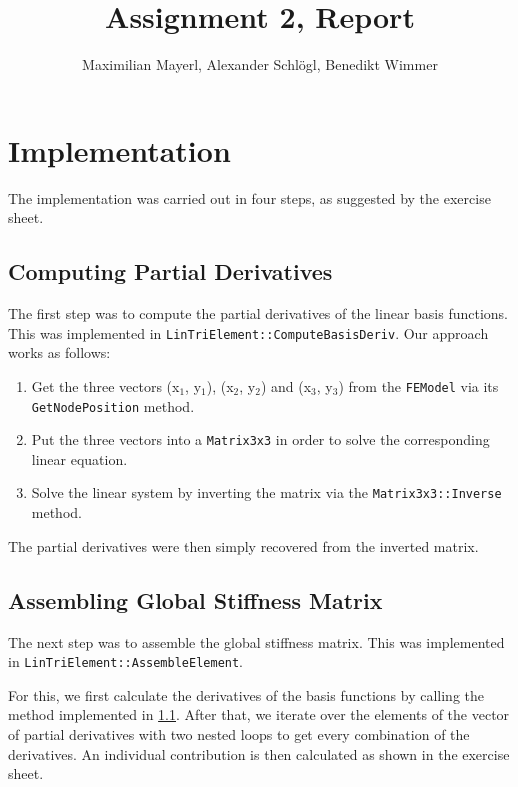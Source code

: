 \documentclass[11pt]{article}
\author{Maximilian Mayerl, Alexander Schl\"ogl, Benedikt Wimmer}
\title{Assignment 2, Report}
\begin{document}
    \maketitle

    \section{Implementation}
    \label{sec:implementation}
    The implementation was carried out in four steps, as suggested by the exercise sheet.


        \subsection{Computing Partial Derivatives}
        \label{sec:partderiv}
        The first step was to compute the partial derivatives of the linear basis functions. This was implemented in \texttt{LinTriElement::ComputeBasisDeriv}. Our approach works as follows:

        \begin{enumerate}
            \item Get the three vectors (x$_1$, y$_1$), (x$_2$, y$_2$) and (x$_3$, y$_3$) from the \texttt{FEModel} via its \texttt{GetNodePosition} method.
            \item Put the three vectors into a \texttt{Matrix3x3} in order to solve the corresponding linear equation.
            \item Solve the linear system by inverting the matrix via the \texttt{Matrix3x3::Inverse} method.
        \end{enumerate}

        The partial derivatives were then simply recovered from the inverted matrix.         
        
        
        \subsection{Assembling Global Stiffness Matrix}
        \label{sec:stiffmat}
        The next step was to assemble the global stiffness matrix. This was implemented in \texttt{LinTriElement::AssembleElement}. 

        For this, we first calculate the derivatives of the basis functions by calling the method implemented in \ref{sec:partderiv}. After that, we iterate over the elements of the vector of partial derivatives with two nested loops to get every combination of the derivatives. An individual contribution is then calculated as shown in the exercise sheet.
\end{document}
